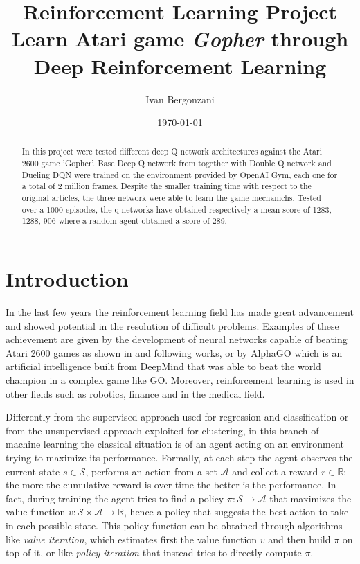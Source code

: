 \documentclass[article,11pt]{article}
\begin{document}
	
	\title{Reinforcement Learning Project\\Learn Atari game \textit{Gopher} through Deep Reinforcement Learning}
	\author{Ivan Bergonzani}
	\date{\today}
	\maketitle
	
	\begin{abstract}
		In this project were tested different deep Q network architectures against the Atari 2600 game 'Gopher'.
		Base Deep Q network from \cite{dqn2013}\cite{dqn2015} together with Double Q network \cite{doubledqn} and Dueling DQN \cite{duelingdqn} were trained on the environment provided by OpenAI Gym, each one for a total of 2 million frames. Despite the smaller training time with respect to the original articles, the three network were able to learn the game mechanichs. Tested over a 1000 episodes, the q-networks have obtained respectively a mean score of 1283, 1288, 906 where a random agent obtained a score of 289.
		
	\end{abstract}
	
	
	\section{Introduction}
	 
	In the last few years the reinforcement learning field has made great advancement and showed potential in the resolution of difficult problems. Examples of these achievement are given by the development of  neural networks capable of beating Atari 2600 games as shown in \cite{dqn2013} and following works, or by AlphaGO which is an artificial intelligence built from DeepMind that was able to beat the world champion in a complex game like GO. Moreover, reinforcement learning is used in other fields such as robotics, finance and in the medical field.
	
	Differently from the supervised approach used for regression and classification or from the unsupervised approach exploited for clustering, in this branch of machine learning the classical situation is of an agent acting on an environment trying to maximize its performance. Formally, at each step the agent observes the current state $s\in\mathcal{S}$, performs an action from a set $\mathcal{A}$ and collect a reward $r\in\mathbb{R}$: the more the cumulative reward is over time the better is the performance. In fact, during training the agent tries to find a policy $\pi:\mathcal{S}\to\mathcal{A}$ that maximizes the value function $v: \mathcal{S}\times\mathcal{A}\to\mathbb{R}$, hence a policy that suggests the best action to take in each possible state. This policy function can be obtained through algorithms like \textit{value iteration}, which estimates first the value function $v$ and then build $\pi$ on top of it, or like \textit{policy iteration} that instead tries to directly compute $\pi$.
	
\end{document}
